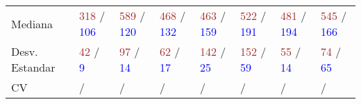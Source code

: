 \begin{table}[ht]
\begin{tabular}{p{2.4cm} p{1.3cm} p{1.3cm} p{1.3cm} p{1.3cm} p{1.3cm} p{1.3cm} p{1.3cm}}
		Mediana & \textcolor{brown}{318} / \textcolor{blue}{106} & \textcolor{brown}{589} / \textcolor{blue}{120} & \textcolor{brown}{468} / \textcolor{blue}{132} & \textcolor{brown}{463} / \textcolor{blue}{159} & \textcolor{brown}{522} / \textcolor{blue}{191} & \textcolor{brown}{481} / \textcolor{blue}{194} & \textcolor{brown}{545} / \textcolor{blue}{166} \\
		Desv. Estandar & \textcolor{brown}{42} / \textcolor{blue}{9} & \textcolor{brown}{97} / \textcolor{blue}{14} & \textcolor{brown}{62} / \textcolor{blue}{17} & \textcolor{brown}{142} / \textcolor{blue}{25} & \textcolor{brown}{152} / \textcolor{blue}{59} & \textcolor{brown}{55} / \textcolor{blue}{14} & \textcolor{brown}{74} / \textcolor{blue}{65} \\
		CV & \textcolor{brown}{} / \textcolor{blue}{} & \textcolor{brown}{} / \textcolor{blue}{} & \textcolor{brown}{} / \textcolor{blue}{} & \textcolor{brown}{} / \textcolor{blue}{} & \textcolor{brown}{} / \textcolor{blue}{} & \textcolor{brown}{} / \textcolor{blue}{} & \textcolor{brown}{} / \textcolor{blue}{} \\ [1ex]
		\hline
	\end{tabular}
	\label{table:tiempo_topo_mediana}
\end{table}

